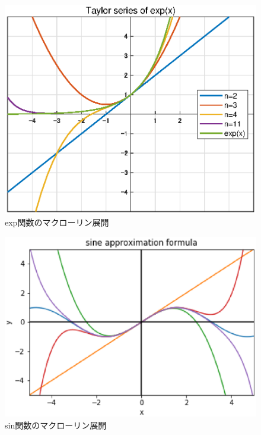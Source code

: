 \documentclass[11pt,a4paper]{ujreport} 	%
\begin{document}
\begin{figure}[H]
\label{im:exp}
  \centering
  \includegraphics[width=12cm]{../figures/exp.eps}
  \caption{exp関数のマクローリン展開}
\end{figure}
\begin{figure}[H]
\label{im:sine}
  \centering
  \includegraphics[width=12cm]{../figures/sine.eps}
  \caption{sin関数のマクローリン展開}
\end{figure}
\end{document}
